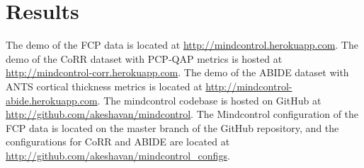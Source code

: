 \section{Results}

The demo of the FCP data is located at \href{http://mindcontrol.herokuapp.com}{http://mindcontrol.herokuapp.com}. The demo of the CoRR dataset with PCP-QAP metrics is hosted at \href{http://mindcontrol-corr.herokuapp.com}{http://mindcontrol-corr.herokuapp.com}. The demo of the ABIDE dataset with ANTS cortical thickness metrics is located at \href{http://mindcontrol-abide.herokuapp.com}{http://mindcontrol-abide.herokuapp.com}. The mindcontrol codebase is hosted on GitHub at \href{http://github.com/akeshavan/mindcontrol}{http://github.com/akeshavan/mindcontrol}. The Mindcontrol configuration of the FCP data is located on the master branch of the GitHub repository, and the configurations for CoRR and ABIDE are located at \href{http://github.com/akeshavan/mindcontrol_configs}{http://github.com/akeshavan/mindcontrol\_configs}.

